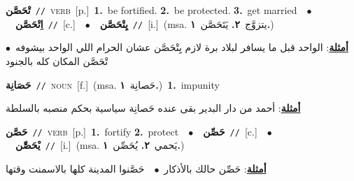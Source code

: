 \documentclass[10pt,a4paper,twoside]{article} %
\begin{document}
\begin{multicols}{2}
{\setlength\topsep{0pt}\textbf{\foreignlanguage{arabic}{تْحَصَّن}}\ {\color{gray}\texttt{//}\color{black}}\ \textsc{verb}\ [p.]\ \textbf{1.}~be fortified.  \textbf{2.}~be protected.  \textbf{3.}~get married\ \ $\bullet$\ \ \setlength\topsep{0pt}\textbf{\foreignlanguage{arabic}{اِتْحَصَّن}}\ {\color{gray}\texttt{//}\color{black}}\ [c.]\ \ $\bullet$\ \ \setlength\topsep{0pt}\textbf{\foreignlanguage{arabic}{يِتْحَصَّن}}\ {\color{gray}\texttt{//}\color{black}}\ [i.]\ \color{gray}(msa. \foreignlanguage{arabic}{يتزوَّج}~\foreignlanguage{arabic}{\textbf{٢.}}  \foreignlanguage{arabic}{يَتَحَصَّن}~\foreignlanguage{arabic}{\textbf{١.}})\color{black}\  \begin{flushright}\color{gray}\foreignlanguage{arabic}{\textbf{\underline{\foreignlanguage{arabic}{أمثلة}}}: الواحد قبل ما يسافر لبلاد برة لازم يِتْحَصَّن عشان الحرام اللي الواحد بيشوفه\ $\bullet$\ \  تْحَصَّن المكان كله بالجنود}\end{flushright}\color{black}} \vspace{2mm}

{\setlength\topsep{0pt}\textbf{\foreignlanguage{arabic}{حَصَانِة}}\ {\color{gray}\texttt{//}\color{black}}\ \textsc{noun}\ [f.]\ \color{gray}(msa. \foreignlanguage{arabic}{حَصانِة}~\foreignlanguage{arabic}{\textbf{١.}})\color{black}\ \textbf{1.}~impunity\  \begin{flushright}\color{gray}\foreignlanguage{arabic}{\textbf{\underline{\foreignlanguage{arabic}{أمثلة}}}: أحمد من دار البدير بقى عنده حَصانِة سياسية بحكم منصبه بالسلطة}\end{flushright}\color{black}} \vspace{2mm}

{\setlength\topsep{0pt}\textbf{\foreignlanguage{arabic}{حَصَّن}}\ {\color{gray}\texttt{//}\color{black}}\ \textsc{verb}\ [p.]\ \textbf{1.}~fortify  \textbf{2.}~protect\ \ $\bullet$\ \ \setlength\topsep{0pt}\textbf{\foreignlanguage{arabic}{حَصِّن}}\ {\color{gray}\texttt{//}\color{black}}\ [c.]\ \ $\bullet$\ \ \setlength\topsep{0pt}\textbf{\foreignlanguage{arabic}{يْحَصِّْن}}\ {\color{gray}\texttt{//}\color{black}}\ [i.]\ \color{gray}(msa. \foreignlanguage{arabic}{يَحمي}~\foreignlanguage{arabic}{\textbf{٢.}}  \foreignlanguage{arabic}{يُحَصِّن}~\foreignlanguage{arabic}{\textbf{١.}})\color{black}\  \begin{flushright}\color{gray}\foreignlanguage{arabic}{\textbf{\underline{\foreignlanguage{arabic}{أمثلة}}}: حَصِّن حالك بالأذكار\ $\bullet$\ \  حَصَّنوا المدينة كلها بالاسمنت وقتها}\end{flushright}\color{black}} \vspace{2mm}


\end{multicols}
\end{document}
